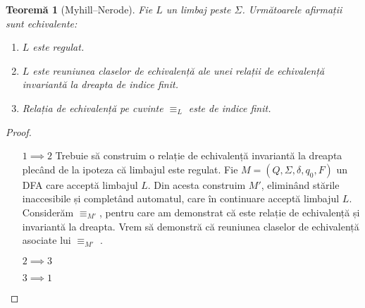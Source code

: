 \documentclass[a4paper, 12pt]{article}
\newtheorem*{theorem}{Teoremă}
\theoremstyle{definition}
\theoremstyle{remark}
\newcommand{\wordequiv}{\operatorname{\equiv}_{L}}
\newcommand{\dfaequiv}[1][M]{\operatorname{\equiv}_{#1}}
\begin{document}
\begin{theorem}[Myhill--Nerode]
Fie \(L\) un limbaj peste \(\Sigma\). Următoarele afirmații sunt echivalente:
\begin{enumerate}
    \item \(L\) este regulat.
    \item \(L\) este reuniunea claselor de echivalență ale unei relații de echivalență invariantă la dreapta de indice finit.
    \item Relația de echivalență pe cuvinte \(\wordequiv\) este de indice finit.
\end{enumerate}
\end{theorem}
\begin{proof}
~
\begin{itemize}
    \item[\(1 \implies 2\)] Trebuie să construim o relație de echivalență invariantă la dreapta plecând de la ipoteza că limbajul este regulat.
    Fie \(M = (Q, \Sigma, \delta, q_0, F)\) un DFA care acceptă limbajul \(L\). Din acesta construim \(M'\), eliminând stările inaccesibile și completând automatul, care în continuare acceptă limbajul \(L\).
    Considerăm \(\dfaequiv[M']\), pentru care am demonstrat că este relație de echivalență și invariantă la dreapta.
    Vrem să demonstră că reuniunea claselor de echivalență asociate lui \(\dfaequiv[M']\) .
    \item[\(2 \implies 3\)]
    \item[\(3 \implies 1\)]
\end{itemize}
\end{proof}
\end{document}
